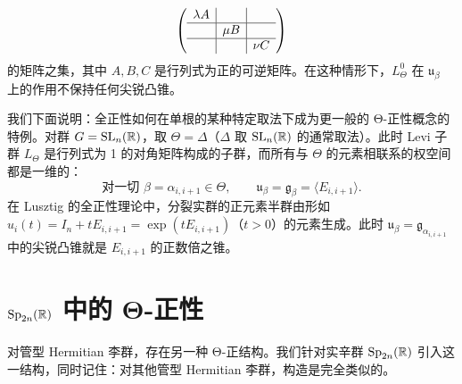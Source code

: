 \[
\left(
\begin{array}{c|c|c}
\lambda A & & \\ \hline
 & \mu B & \\ \hline
 & & \nu C
\end{array}
\right)
\]
的矩阵之集，其中 $A,B,C$ 是行列式为正的可逆矩阵。在这种情形下，$L_\Theta^0$ 在 $\mathfrak{u}_\beta$ 上的作用不保持任何尖锐凸锥。


我们下面说明：全正性如何在单根的某种特定取法下成为更一般的 Θ-正性概念的特例。对群 $G=\operatorname{SL}_n(\mathbb{R})$，取 $\Theta=\Delta$（$\Delta$ 取 $\operatorname{SL}_n(\mathbb{R})$ 的通常取法）。此时 Levi 子群 $L_\Theta$ 是行列式为 1 的对角矩阵构成的子群，而所有与 $\Theta$ 的元素相联系的权空间都是一维的：
\[
\text{对一切 } \beta=\alpha_{i,i+1}\in\Theta,\qquad
\mathfrak{u}_\beta=\mathfrak{g}_\beta=\langle E_{i,i+1}\rangle.
\]
在 Lusztig 的全正性理论中，分裂实群的正元素半群由形如 $u_i(t)=I_n+tE_{i,i+1}=\exp(tE_{i,i+1})$（$t>0$）的元素生成。此时 $\mathfrak{u}_\beta=\mathfrak{g}_{\alpha_{i,i+1}}$ 中的尖锐凸锥就是 $E_{i,i+1}$ 的正数倍之锥。


\section{$\operatorname{Sp}_{2n}(\mathbb{R})$ 中的 Θ-正性}

对管型 Hermitian 李群，存在另一种 Θ-正结构。我们针对实辛群 $\operatorname{Sp}_{2n}(\mathbb{R})$ 引入这一结构，同时记住：对其他管型 Hermitian 李群，构造是完全类似的。

